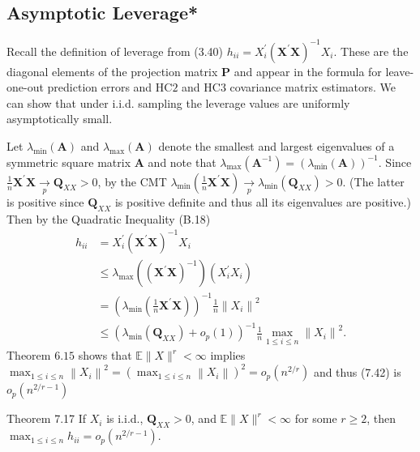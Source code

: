 \documentclass[10pt]{article}
\begin{document}
\subsection{Asymptotic Leverage*}
Recall the definition of leverage from (3.40) $h_{i i}=X_{i}^{\prime}\left(\boldsymbol{X}^{\prime} \boldsymbol{X}\right)^{-1} X_{i}$. These are the diagonal elements of the projection matrix $\boldsymbol{P}$ and appear in the formula for leave-one-out prediction errors and $\mathrm{HC} 2$ and HC3 covariance matrix estimators. We can show that under i.i.d. sampling the leverage values are uniformly asymptotically small.

Let $\lambda_{\min }(\boldsymbol{A})$ and $\lambda_{\max }(\boldsymbol{A})$ denote the smallest and largest eigenvalues of a symmetric square matrix $\boldsymbol{A}$ and note that $\lambda_{\max }\left(\boldsymbol{A}^{-1}\right)=\left(\lambda_{\min }(\boldsymbol{A})\right)^{-1}$. Since $\frac{1}{n} \boldsymbol{X}^{\prime} \boldsymbol{X} \underset{p}{\rightarrow} \boldsymbol{Q}_{X X}>0$, by the CMT $\lambda_{\min }\left(\frac{1}{n} \boldsymbol{X}^{\prime} \boldsymbol{X}\right) \underset{p}{\rightarrow} \lambda_{\min }\left(\boldsymbol{Q}_{X X}\right)>0$. (The latter is positive since $\boldsymbol{Q}_{X X}$ is positive definite and thus all its eigenvalues are positive.) Then by the Quadratic Inequality (B.18)
$$
\begin{aligned}
h_{i i} &=X_{i}^{\prime}\left(\boldsymbol{X}^{\prime} \boldsymbol{X}\right)^{-1} X_{i} \\
& \leq \lambda_{\max }\left(\left(\boldsymbol{X}^{\prime} \boldsymbol{X}\right)^{-1}\right)\left(X_{i}^{\prime} X_{i}\right) \\
&=\left(\lambda_{\min }\left(\frac{1}{n} \boldsymbol{X}^{\prime} \boldsymbol{X}\right)\right)^{-1} \frac{1}{n}\left\|X_{i}\right\|^{2} \\
& \leq\left(\lambda_{\min }\left(\boldsymbol{Q}_{X X}\right)+o_{p}(1)\right)^{-1} \frac{1}{n} \max _{1 \leq i \leq n}\left\|X_{i}\right\|^{2} .
\end{aligned}
$$
Theorem $6.15$ shows that $\mathbb{E}\|X\|^{r}<\infty$ implies $\max _{1 \leq i \leq n}\left\|X_{i}\right\|^{2}=\left(\max _{1 \leq i \leq n}\left\|X_{i}\right\|\right)^{2}=o_{p}\left(n^{2 / r}\right)$ and thus (7.42) is $o_{p}\left(n^{2 / r-1}\right)$

Theorem 7.17 If $X_{i}$ is i.i.d., $\boldsymbol{Q}_{X X}>0$, and $\mathbb{E}\|X\|^{r}<\infty$ for some $r \geq 2$, then $\max _{1 \leq i \leq n} h_{i i}=o_{p}\left(n^{2 / r-1}\right)$.
\end{document}
